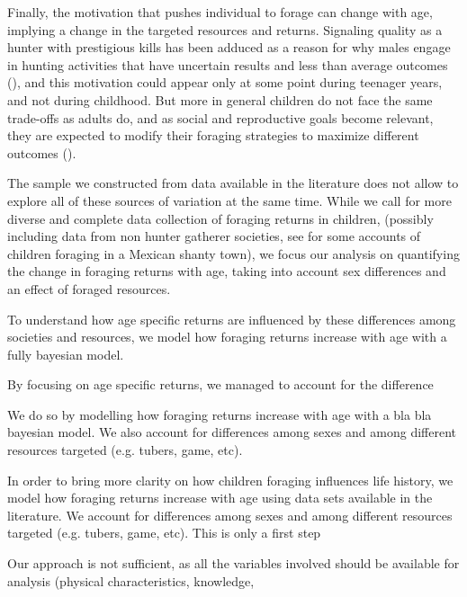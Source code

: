 Finally, the motivation that pushes individual to forage can change with age, implying a change in the targeted resources and returns. Signaling quality as a hunter with prestigious kills has been adduced as a reason for why males engage in hunting activities that have uncertain results and less than average outcomes (\cite{hawkess?}), and this motivation could appear only at some point during teenager years, and not during childhood. But more in general children do not face the same trade-offs as adults do, and as social and reproductive goals become relevant, they are expected to modify their foraging strategies to maximize different outcomes (\cite{bird_constraints_2002}). 

The sample we constructed from data available in the literature does not allow to explore all of these sources of variation at the same time. While we call for more diverse and complete data collection of foraging returns in children, (possibly including data from non hunter gatherer societies, see \cite{lee_child_2007,lee_childrens_2009} for some accounts of children foraging in a Mexican shanty town), we focus our analysis on quantifying the change in foraging returns with age, taking into account sex differences and an effect of foraged resources.


















To understand how age specific returns are influenced by these differences among societies and resources, we model how foraging returns increase with age with a fully bayesian model. 

By focusing on age specific returns, we managed to account for the difference


We do so by modelling how foraging returns increase with age with a bla bla bayesian model. We also account for differences among sexes and among different resources targeted (e.g. tubers, game, etc).

In order to bring more clarity on how children foraging influences life history, we model how foraging returns increase with age using data sets available in the literature. We account for differences among sexes and among different resources targeted (e.g. tubers, game, etc). This is only a first step 

Our approach is not sufficient, as all the variables involved should be available for analysis (physical characteristics, knowledge, 


